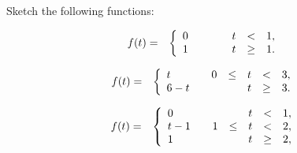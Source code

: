 \begin{problem}
\item Sketch the following functions:

  \begin{subproblem}
  \item 
    \begin{eqnarray}
      f(t) & = & \left\{
        \begin{array}{l@{\hspace{2em}}rcccl}
          0 &    &  & t & < & 1, \\
          1 &    &  & t & \geq & 1. \\
        \end{array}
      \right.
    \end{eqnarray}
    \vfill

  \item 
    \begin{eqnarray}
      f(t) & = & \left\{
        \begin{array}{l@{\hspace{2em}}rcccl}
          t & 0 & \leq & t & < & 3, \\
          6-t &  &     & t & \geq & 3. \\
        \end{array}
      \right.
    \end{eqnarray}
    \vfill

  \item 
    \begin{eqnarray}
      f(t) & = & \left\{
        \begin{array}{l@{\hspace{2em}}rcccl}
          0   &    &  & t & < & 1, \\
          t-1 &  1 & \leq & t & < & 2, \\
          1   &    &      & t & \geq & 2, \\
        \end{array}
      \right.
    \end{eqnarray}
    \vfill

  \end{subproblem}

\end{problem}

